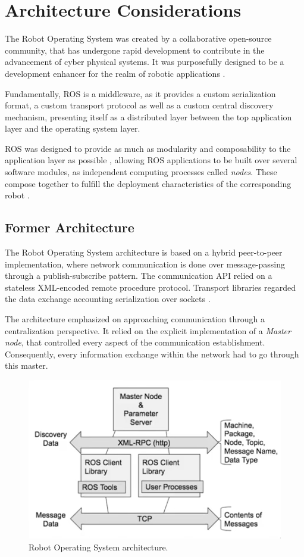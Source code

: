 \section{Architecture Considerations}

The Robot Operating System was created by a collaborative open-source community, that has undergone rapid development \cite{cousins2011exponential} to contribute in the advancement of cyber physical systems. It was purposefully designed to be a development enhancer for the realm of robotic applications \cite{diluoffo2018robot, intro-ros}.

Fundamentally, ROS is a middleware, as it provides a custom serialization format, a custom transport protocol as well as a custom central discovery mechanism, presenting itself as a distributed layer between the top application layer and the operating system layer. 

ROS was designed to provide as much as modularity and composability to the application layer as possible \cite{casini2019response}, allowing ROS applications to be built over several software modules, as independent computing processes called \textit{nodes}. These compose together to fulfill the deployment characteristics of the corresponding robot \cite{maruyama2016exploring}.

\subsection{Former Architecture}

The Robot Operating System architecture is based on a hybrid peer-to-peer implementation, where network communication is done over message-passing through a publish-subscribe pattern. The communication API relied on a stateless XML-encoded remote procedure protocol. Transport libraries regarded the data exchange accounting serialization over sockets \cite{white2016sros, dieber2020penetration}.

The architecture emphasized on approaching communication through a centralization perspective. It relied on the explicit implementation of a \textit{Master node}, that controlled every aspect of the communication establishment. Consequently, every information exchange within the network had to go through this master.


\begin{figure}[H]
  \centering
  \includegraphics[width=0.6\linewidth]{images/former-ros1-architecture.png}
  \caption{Robot Operating System architecture.}
  \label{fig:ros1-architecture}
\end{figure}


